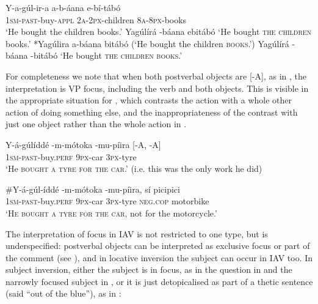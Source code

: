 \documentclass[output=paper]{langsci/langscibook}
\begin{document}
\ea\label{ex:vanderwal:5}
\settowidth{\jamwidth}{[-A, +A]}
\ea\label{ex:vanderwal:5a}{
\gll Y-a-gúl-ir-a      a-b-áana    e-bí-tábó  \\
       1\textsc{sm}-\textsc{past}-buy-\textsc{appl }   \textsc{2a-2px}-children  \textsc{8a-8px}-books\\\jambox{\textup{[+A, +A]}}
}
\glt   ‘He bought the children books.’             
\ex\label{ex:vanderwal:5b}  Yagúlírá {\longrule}-báana ebitábó             \jambox{\textup{[-A, +A]}}
\glt   ‘He bought \textsc{the children} books.’           
\ex \label{ex:vanderwal:5c} *Yagúlira a-báana {\longrule}bitábó            \jambox{\textup{[+A, -A]}}
\glt   (‘He bought the children \textsc{books}.’)           
\ex  \label{ex:vanderwal:5d} {Yagúlírá {\longrule}-báana {\longrule}-bitábó}            \jambox{\textup{[-A, -A]}}
\glt  ‘He bought \textsc{the children books}.’ \citep[228--229]{HymanKatamba1993}
\z
\z

For completeness we note that when both postverbal objects are [-A], as in , the interpretation is VP focus, including the verb and both objects. This is visible in the appropriate situation for , which contrasts the action with a whole other action of doing something else, and the inappropriateness of the contrast with just one object rather than the whole action in .

\settowidth{\jamwidth}{[-A, +A]}
\ea\label{ex:vanderwal:6}{
\gll Y-á-gúlíddé    {\longrule}-m-mótoka    {\longrule}-mu-píira      \textup{[-A, -A]}\\
 \textsc{1sm-past}-buy.\textsc{perf}       \textsc{9px}-car              \textsc{3px}-tyre\\\jambox{\textup{[-A, -A]}}
}
\glt‘He \textsc{bought a tyre for the car}.’ (i.e. this was the only work he did) 
\z

\ea\label{ex:vanderwal:7}
\gll \#Y-á-gúl-íddé      {\longrule}-m-mótoka    {\longrule}-mu-píira,  sí    picipici\\
     \textsc{1sm-past}-buy.\textsc{perf   }    \textsc{9px}-car       \textsc{3px}-tyre   \textsc{neg}.\textsc{cop}  motorbike\\
\glt   ‘\textsc{He bought a tyre for the car}, not for the motorcycle.’
\z

The interpretation of focus in IAV is not restricted to one type, but is underspecified: postverbal objects can be interpreted as exclusive focus or part of the comment (see ), and in locative inversion the subject can occur in IAV too. In subject inversion, either the subject is in focus, as in the question in  and the narrowly focused subject in , or it is just detopicalised as part of a thetic sentence (said “out of the blue”), as in :
\end{document}
